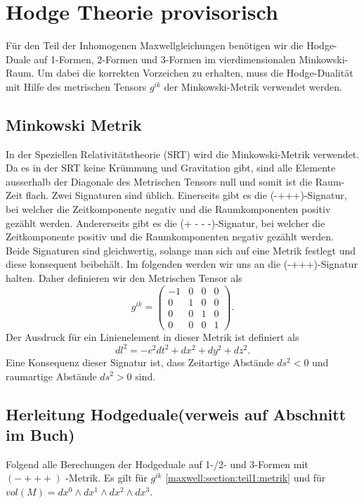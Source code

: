%
%
%
%
\section{Hodge Theorie provisorisch
\label{maxwell:section:teil1}}
Für den Teil der Inhomogenen Maxwellgleichungen benötigen wir die Hodge-Duale auf 1-Formen, 2-Formen und 3-Formen im vierdimensionalen Minkowski-Raum.
Um dabei die korrekten Vorzeichen zu erhalten, muss die Hodge-Dualität mit Hilfe des metrischen Tensors $g^{ik}$  der Minkowski-Metrik verwendet werden.



\subsection{Minkowski Metrik}
In der Speziellen Relativitätstheorie (SRT) wird die Minkowski-Metrik verwendet.
Da es in der SRT keine Krümmung und Gravitation gibt, sind alle Elemente ausserhalb der Diagonale des Metrischen Tensors null und somit ist die Raum-Zeit flach.
Zwei Signaturen sind üblich.
Einerseits gibt es die (-+++)-Signatur, bei welcher die Zeitkomponente negativ und die Raumkomponenten positiv gezählt werden.
Andererseits gibt es die (+ - - -)-Signatur, bei welcher die Zeitkomponente positiv und die Raumkomponenten negativ gezählt werden.
Beide Signaturen sind gleichwertig, solange man sich auf eine Metrik festlegt und diese konsequent beibehält.
Im folgenden werden wir uns an die (-+++)-Signatur halten.
Daher definieren wir den Metrischen Tensor als
\begin{equation}
	g^{ik} = \begin{pmatrix}
		-1 & 0 & 0 & 0 \\ 0 & 1 & 0 & 0 \\ 0 & 0 & 1 & 0 \\ 0 & 0 & 0 & 1 
	\end{pmatrix}.
	\label{maxwell:section:teil1:metrik}
\end{equation}
Der Ausdruck für ein Linienelement in dieser Metrik ist definiert als
\begin{equation}
	dl^2 = -c^2dt^2 +dx^2+dy^2+dz^2.
\end{equation}
Eine Konsequenz dieser Signatur ist, dass Zeitartige Abstände $ds^2 < 0$ und raumartige Abstände $ds^2 > 0$ sind.


\subsection{Herleitung Hodgeduale(verweis auf Abschnitt im Buch)}
Folgend alle Berechungen der Hodgeduale auf 1-/2- und 3-Formen mit $(-+++)$ -Metrik.
Es gilt für $g^{ik}$ \eqref{maxwell:section:teil1:metrik} und für $ vol(M) = dx^0 \wedge dx^1 \wedge dx^2 \wedge dx^3$.

